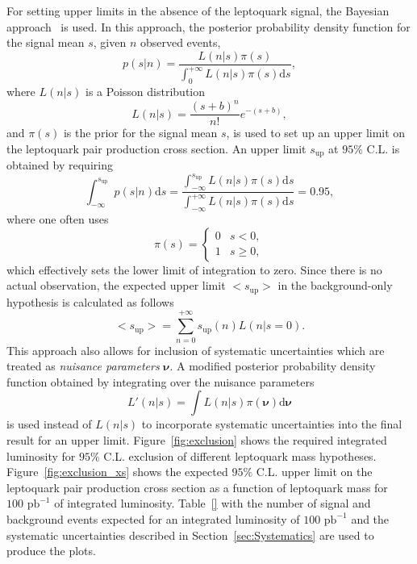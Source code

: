 For setting upper limits in the absence of the leptoquark signal, the Bayesian approach~\cite{ref:bayes} is used. In this approach, the
posterior probability density function for the signal mean $s$, given $n$ observed events,
\begin{equation}
p(s|n)=\frac{L(n|s)\pi(s)}{\int_0^{+\infty}L(n|s)\pi(s)\mathrm{d}s},
\end{equation}
where $L(n|s)$ is a Poisson distribution
\begin{equation}
L(n|s)=\frac{(s+b)^n}{n!}e^{-(s+b)},
\end{equation}
and $\pi(s)$ is the prior for the signal mean $s$, is used to set up an upper limit on the leptoquark pair production cross section.
An upper limit $s_\text{up}$ at $95\%$ C.L. is obtained by requiring
\begin{equation}
\int_{-\infty}^{s_\text{up}}p(s|n)\mathrm{d}s=\frac{\int_{-\infty}^{s_\text{up}}L(n|s)\pi(s)\mathrm{d}s}{\int_{-\infty}^{+\infty}L(n|s)\pi(s)\mathrm{d}s}=0.95, 
\end{equation}
where one often uses
\begin{equation}
\pi(s)=\begin{cases}
          0&  s<0,\\
          1&  s\geq 0,
\end{cases}
\end{equation}
which effectively sets the lower limit of integration to zero. Since there is no actual observation, the expected 
upper limit $\mathrm{<}s_\text{up}\mathrm{>}$ in the background-only hypothesis is calculated as follows
\begin{equation}
\mathrm{<}s_\text{up}\mathrm{>}=\sum_{n=0}^{+\infty} s_\text{up}(n)L(n|s=0).
\end{equation}
This approach also allows for inclusion of systematic uncertainties which are treated as \emph{nuisance parameters} $\bm{\nu}$.
A modified posterior probability density function obtained by integrating over the nuisance parameters
\begin{equation}
L'(n|s)=\int L(n|s)\pi(\bm{\nu})\mathrm{d}\bm{\nu}
\end{equation}
is used instead of $L(n|s)$ to incorporate systematic uncertainties into the final result for an upper limit. Figure~\ref{fig:exclusion}
shows the required integrated luminosity for $95\%$ C.L. exclusion of different leptoquark mass hypotheses. Figure~\ref{fig:exclusion_xs}
shows the expected $95\%$ C.L. upper limit on the leptoquark pair production cross section as a function of leptoquark mass for $100\text{ pb}^{-1}$
of integrated luminosity. Table~\ref{} with the number of signal and background events expected for an integrated luminosity
of $100\text{ pb}^{-1}$ and the systematic uncertainties described in Section~\ref{sec:Systematics} are used to produce the plots.


